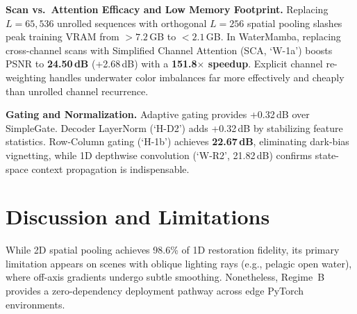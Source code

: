 \documentclass[conference]{IEEEtran}
\begin{document}
	\textbf{Scan vs.\ Attention Efficacy and Low Memory Footprint.} Replacing $L=65{,}536$ unrolled sequences with orthogonal $L=256$ spatial pooling slashes peak training VRAM from $>7.2$\,GB to $<2.1$\,GB. In WaterMamba, replacing cross-channel scans with Simplified Channel Attention (SCA, `W-1a') boosts PSNR to \textbf{24.50\,dB} (+2.68\,dB) with a \textbf{151.8$\times$ speedup}. Explicit channel re-weighting handles underwater color imbalances far more effectively and cheaply than unrolled channel recurrence.
	
	\textbf{Gating and Normalization.} Adaptive gating provides +0.32\,dB over SimpleGate. Decoder LayerNorm (`H-D2') adds +0.32\,dB by stabilizing feature statistics. Row-Column gating (`H-1b') achieves \textbf{22.67\,dB}, eliminating dark-bias vignetting, while 1D depthwise convolution (`W-R2', 21.82\,dB) confirms state-space context propagation is indispensable.
	
	\section{Discussion and Limitations}
	While 2D spatial pooling achieves 98.6\% of 1D restoration fidelity, its primary limitation appears on scenes with oblique lighting rays (e.g., pelagic open water), where off-axis gradients undergo subtle smoothing. Nonetheless, Regime~B provides a zero-dependency deployment pathway across edge PyTorch environments.
	
\end{document}
